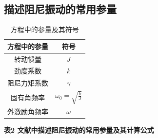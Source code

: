 \documentclass[12pt,a4paper]{amsart}
\begin{document}
\subsection{描述阻尼振动的常用参量}

\begin{table}
    \centering
    \caption{方程中的参量及其符号}
    \begin{tabular}{cc}
        \toprule
        方程中的参量 & 符号                            \\
        \midrule
        转动惯量     & $J$                             \\
        劲度系数     & $k$                             \\
        阻尼力矩系数 & $\gamma$                        \\
        固有角频率   & $\omega_0 = \sqrt{\frac{k}{J}}$ \\
        外激励角频率 & $\omega$                        \\
        \bottomrule
    \end{tabular}
    \label{chart:1}
\end{table}


\textbf{表2 文献中描述阻尼振动的常用参量及其计算公式}
\end{document}
